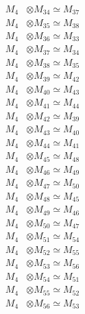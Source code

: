 \begin{align*}
M_{4} &\otimes M_{34} \simeq M_{37} \\
M_{4} &\otimes M_{35} \simeq M_{38} \\
M_{4} &\otimes M_{36} \simeq M_{33} \\
M_{4} &\otimes M_{37} \simeq M_{34} \\
M_{4} &\otimes M_{38} \simeq M_{35} \\
M_{4} &\otimes M_{39} \simeq M_{42} \\
M_{4} &\otimes M_{40} \simeq M_{43} \\
M_{4} &\otimes M_{41} \simeq M_{44} \\
M_{4} &\otimes M_{42} \simeq M_{39} \\
M_{4} &\otimes M_{43} \simeq M_{40} \\
M_{4} &\otimes M_{44} \simeq M_{41} \\
M_{4} &\otimes M_{45} \simeq M_{48} \\
M_{4} &\otimes M_{46} \simeq M_{49} \\
M_{4} &\otimes M_{47} \simeq M_{50} \\
M_{4} &\otimes M_{48} \simeq M_{45} \\
M_{4} &\otimes M_{49} \simeq M_{46} \\
M_{4} &\otimes M_{50} \simeq M_{47} \\
M_{4} &\otimes M_{51} \simeq M_{54} \\
M_{4} &\otimes M_{52} \simeq M_{55} \\
M_{4} &\otimes M_{53} \simeq M_{56} \\
M_{4} &\otimes M_{54} \simeq M_{51} \\
M_{4} &\otimes M_{55} \simeq M_{52} \\
M_{4} &\otimes M_{56} \simeq M_{53} \\
\end{align*}

